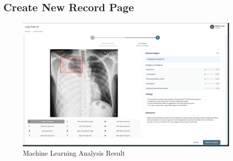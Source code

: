 \documentclass[12pt, titlepage]{article}
\begin{document}
\newpage
\subsection{Create New Record Page}
  \begin{figure}[ht!] 
    \centering
    \includegraphics[scale=0.25]{../../assets/analysis_result.png}
    \caption{Machine Learning Analysis Result}
    \label{fig:new_record_4}
  \end{figure}
\end{document}
